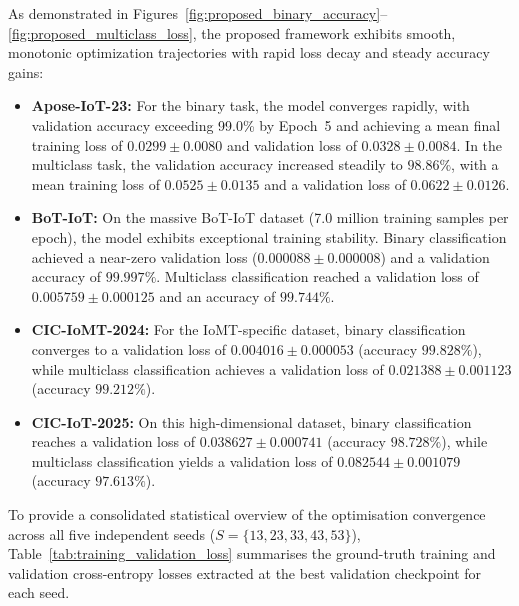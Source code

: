 \documentclass[a4paper,fleqn]{cas-sc}
\begin{document}
As demonstrated in Figures~\ref{fig:proposed_binary_accuracy}--\ref{fig:proposed_multiclass_loss}, the proposed framework exhibits smooth, monotonic optimization trajectories with rapid loss decay and steady accuracy gains:
\begin{itemize}
    \item \textbf{Apose-IoT-23:} For the binary task, the model converges rapidly, with validation accuracy exceeding 99.0\% by Epoch~5 and achieving a mean final training loss of $0.0299 \pm 0.0080$ and validation loss of $0.0328 \pm 0.0084$. In the multiclass task, the validation accuracy increased steadily to $98.86\%$, with a mean training loss of $0.0525 \pm 0.0135$ and a validation loss of $0.0622 \pm 0.0126$.
    \item \textbf{BoT-IoT:} On the massive BoT-IoT dataset (7.0 million training samples per epoch), the model exhibits exceptional training stability. Binary classification achieved a near-zero validation loss ($0.000088 \pm 0.000008$) and a validation accuracy of $99.997\%$. Multiclass classification reached a validation loss of $0.005759 \pm 0.000125$ and an accuracy of $99.744\%$.
    \item \textbf{CIC-IoMT-2024:} For the IoMT-specific dataset, binary classification converges to a validation loss of $0.004016 \pm 0.000053$ (accuracy $99.828\%$), while multiclass classification achieves a validation loss of $0.021388 \pm 0.001123$ (accuracy $99.212\%$).
    \item \textbf{CIC-IoT-2025:} On this high-dimensional dataset, binary classification reaches a validation loss of $0.038627 \pm 0.000741$ (accuracy $98.728\%$), while multiclass classification yields a validation loss of $0.082544 \pm 0.001079$ (accuracy $97.613\%$).
\end{itemize}

To provide a consolidated statistical overview of the optimisation convergence across all five independent seeds ($S=\{13, 23, 33, 43, 53\}$), Table~\ref{tab:training_validation_loss} summarises the ground-truth training and validation cross-entropy losses extracted at the best validation checkpoint for each seed.
\end{document}
